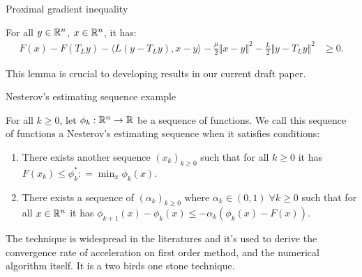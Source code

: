 \documentclass[11pt]{beamer}
\theoremstyle{definition}
\begin{document}
        \begin{frame}{Proximal gradient inequality}
            \begin{lemma}\label{thm:prox-grad-ineq}
                For all $y \in \mathbb R^n$, $x \in \mathbb R^n$, it has: 
                {\scriptsize
                \begin{align*}
                    F(x)  - F(T_Ly) - \langle L(y - T_Ly), x - y\rangle
                    - \frac{\mu}{2}\Vert x - y\Vert^2 - \frac{L}{2}\Vert y - T_Ly\Vert^2 
                    &\ge 0. 
                \end{align*}
                }
            \end{lemma}
            This lemma is crucial to developing results in our current draft paper. 
        \end{frame}
        \begin{frame}{Nesterov's estimating sequence example}
            \begin{definition}\label{def:nes-est-seq}
                For all $k \ge 0$, let $\phi_k : \mathbb R^n \rightarrow\mathbb R$ be a sequence of functions. 
                We call this sequence of functions a Nesterov's estimating sequence when it satisfies conditions: 
                \begin{enumerate}
                    \item There exists another sequence $(x_k)_{k \ge 0}$ such that for all $k \ge 0$ it has $F(x_k) \le \phi_k^*: =\min_{x}\phi_k(x)$. 
                    \item There exists a sequence of $(\alpha_k)_{k \ge 0}$ where $\alpha_k \in (0, 1)\; \forall k \ge0 $ such that for all $x \in \mathbb R^n$ it has $\phi_{k + 1}(x) - \phi_k(x) \le - \alpha_k(\phi_k(x) - F(x))$. 
                \end{enumerate}
            \end{definition}
            The technique is widespread in the literatures and it's used to derive the convergence rate of acceleration on first order method, and the numerical algorithm itself. It is a two birds one stone technique. 
        \end{frame}
\end{document}
